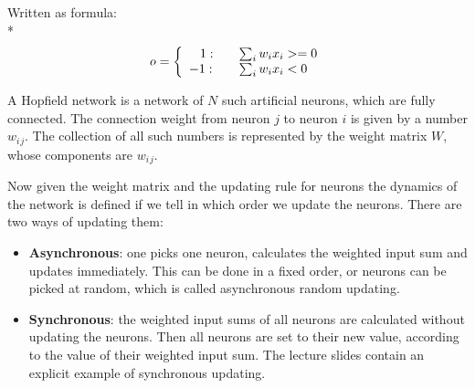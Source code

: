 Written as formula: \\*
\[ o = \left\{ 
               \begin{array}{l l}
               \hspace{3 mm} 1  : & \quad \sum_{i} w_ix_i >= 0 \\
                            -1  : & \quad \sum_{i} w_ix_i < 0
               \end{array} 
       \right.
\]
  
  
A Hopfield network is a network of $N$ such artificial neurons, which are fully
connected. The connection weight from neuron $j$ to neuron $i$ is given by a
number $w$$_i$$_j$. The collection of all such numbers is represented by the weight
matrix $W$, whose components are $w$$_i$$_j$.

Now given the weight matrix and the updating rule for neurons the dynamics
of the network is defined if we tell in which order we update the neurons. There
are two ways of updating them:

\begin {itemize}
\item \textbf{Asynchronous}: one picks one neuron, calculates the weighted input sum
and updates immediately. This can be done in a fixed order, or neurons
can be picked at random, which is called asynchronous random updating.
\item \textbf{Synchronous}: the weighted input sums of all neurons are calculated without
updating the neurons. Then all neurons are set to their new value,
according to the value of their weighted input sum. The lecture slides
contain an explicit example of synchronous updating.
\end{itemize}

